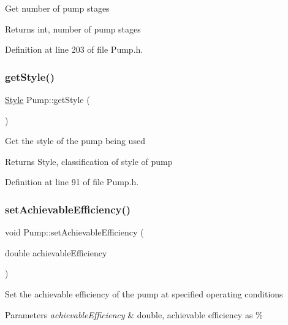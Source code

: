 Get number of pump stages

\begin{DoxyReturn}{Returns}
int, number of pump stages 
\end{DoxyReturn}


Definition at line 203 of file Pump.\+h.

\mbox{\label{class_pump_ab75d877769b5232c5ab7b4d92940579a}} 
\subsubsection{\texorpdfstring{get\+Style()}{getStyle()}}
{\footnotesize\ttfamily \hyperlink{class_pump_aef354601ce4218258cc898b35a1e90ff}{Style} Pump\+::get\+Style (\begin{DoxyParamCaption}{ }\end{DoxyParamCaption})\hspace{0.3cm}{\ttfamily [inline]}}

Get the style of the pump being used

\begin{DoxyReturn}{Returns}
Style, classification of style of pump 
\end{DoxyReturn}


Definition at line 91 of file Pump.\+h.

\mbox{\label{class_pump_a183f83fcc4b77e330451000df4d91046}} 
\subsubsection{\texorpdfstring{set\+Achievable\+Efficiency()}{setAchievableEfficiency()}}
{\footnotesize\ttfamily void Pump\+::set\+Achievable\+Efficiency (\begin{DoxyParamCaption}\item[{double}]{achievable\+Efficiency }\end{DoxyParamCaption})\hspace{0.3cm}{\ttfamily [inline]}}

Set the achievable efficiency of the pump at specified operating conditions


\begin{DoxyParams}{Parameters}
{\em achievable\+Efficiency} & double, achievable efficiency as \% \\
\hline
\end{DoxyParams}


